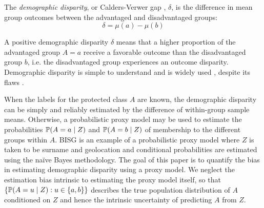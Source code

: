 \begin{definition}
\label{demographic-disparity}
The \textit{demographic disparity}, or Calders-Verwer gap \cite{Calders2010,Kamishima2012}, $\delta$, is the difference in mean group outcomes between the advantaged and disadvantaged groups:
\begin{equation}\label{def:demo-disparity}
\delta = \mu(a) - \mu(b)
\end{equation}
\end{definition}
%
A positive demographic disparity $\delta$ means that a higher proportion of the advantaged group $A=a$ receive a favorable outcome than the disadvantaged group $b$, i.e. the disadvantaged group experiences an outcome disparity.
Demographic disparity is simple to understand and is widely used \cite{lipton2018does, zliobaite2015relation, zafar2016learning}, despite its flaws \cite{dwork2012fairness, hardt2016equality}.

When the labels for the protected class $A$ are known, the demographic disparity can be simply and reliably estimated by the difference of within-group sample means.
Otherwise, a probabilistic proxy model may be used to estimate the probabilities $\mathbb{P} (A = a \mid Z)$ and $\mathbb{P} (A = b \mid Z)$ of membership to the different groups within $A$. BISG \cite{Elliott:2009aa} is an example of a probabilistic proxy model where $Z$ is taken to be surname and geolocation and conditional probabilities are estimated using the na\"ive Bayes methodology.
%
%
The goal of this paper is to quantify the bias in estimating demographic disparity using a proxy model.
We neglect the estimation bias intrinsic to estimating the proxy model itself, so that $\{\mathbb{P} (A = u \mid Z) : u\in\{a,b\} \}$ describes the true population distribution of $A$ conditioned on $Z$ and hence the intrinsic uncertainty of predicting $A$ from $Z$.

